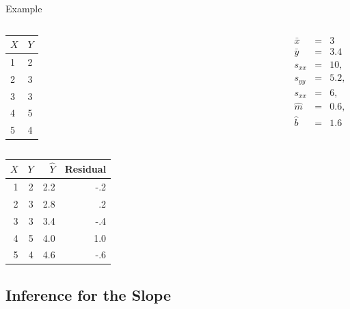 \begin{frame}{Example}

    \begin{columns}

      \begin{tabular}{l|l}
        $X$ & $Y$ \\ \hline
        1 & 2 \\
        2 & 3  \\
        3 & 3 \\
        4 & 5  \\
        5 & 4
      \end{tabular}


        \begin{eqnarray*}
          \bar{x} & = & 3 \\
          \bar{y} & = & 3.4 \\
          s_{xx} & = & 10, \\
          s_{yy} & = & 5.2, \\
          s_{xx} & = & 6, \\
          \hat{m} & = & 0.6, \\
          \hat{b} & = & 1.6
        \end{eqnarray*}

      \end{columns}

  {

      \begin{tabular}{r|r<{\onslide<3->}|r<{\onslide<4->}|r<{\onslide}} %
        $X$ & $Y$ & $\hat{Y}$ & Residual \\ \hline
        1 & 2 & 2.2 & -.2 \\
        2 & 3 & 2.8 &  .2 \\
        3 & 3 & 3.4 & -.4 \\
        4 & 5 & 4.0 & 1.0  \\
        5 & 4 & 4.6 & -.6
      \end{tabular}


  }

  
\end{frame}

\subsection{Inference for the Slope}

